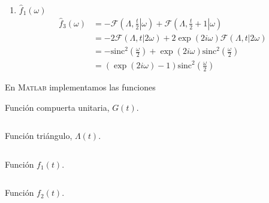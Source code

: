 \documentclass[a4paper,12pt,final]{article}
\begin{document}
\begin{enumerate}[label=\alph*)]
        \item $\widehat{f}_{1}\left(\omega\right)$
          \begin{equation*}
            \begin{split}
              \widehat{f}_{3}\left(\omega\right) & = - \mathcal{F}\left(\Lambda,\left.\frac{t}{2}\right|\omega\right) + \mathcal{F}\left(\Lambda,\left.\frac{t}{2} + 1\right|\omega\right) \\
                                                 & = - 2 \mathcal{F}\left(\Lambda,t| 2 \omega\right) + 2 \exp\left(2 i \omega\right) \mathcal{F}\left(\Lambda,t| 2\omega\right) \\
                                                 & = - \mathrm{sinc}^{2}\left(\frac{\omega}{2}\right) + \exp\left(2 i \omega\right) \mathrm{sinc}^{2}\left(\frac{\omega}{2}\right) \\
                                                 & = \left(\exp\left(2 i \omega\right) - 1\right)\mathrm{sinc}^{2}\left(\frac{\omega}{2}\right)
            \end{split}
          \end{equation*}
      \end{enumerate}

      \noindent En \textsc{Matlab} implementamos las funciones

      \begin{listing}[H]
        \caption{Función compuerta unitaria, $G\left(t\right)$.}
        \label{script01A}
        \inputminted{matlab}{./laboratorio_4/gate.m}
      \end{listing}\vspace{-1.0em}

      \begin{listing}[H]
        \caption{Función triángulo, $\Lambda\left(t\right)$.}
        \label{script01B}
        \inputminted{matlab}{./laboratorio_4/triangle.m}
      \end{listing}\vspace{-1.0em}

      \begin{listing}[H]
        \caption{Función $f_1\left(t\right)$.}
        \label{script01C}
        \inputminted{matlab}{./laboratorio_4/p1_f1.m}
      \end{listing}\vspace{-1.0em}

      \begin{listing}[H]
        \caption{Función $f_2\left(t\right)$.}
        \label{script01D}
        \inputminted{matlab}{./laboratorio_4/p1_f2.m}
      \end{listing}\vspace{-1.0em}
\end{document}
